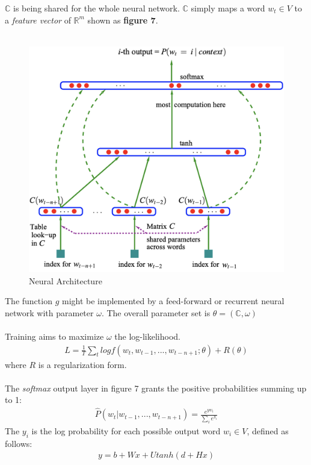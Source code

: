 \documentclass[paper=a4, fontsize=12pt]{scrartcl}
\begin{document}
 $\mathbb{C}$ is being shared for the whole neural network. $\mathbb{C}$ simply maps a word $w_t \in V$ to a \textit{feature vector} of $\mathbb{R}^m$ shown as \textbf{figure 7}.\\\\
 \begin{figure}
  \includegraphics[width=\linewidth]{neuralnet.png}
  \caption{Neural Architecture}
  \label{fig:nnlm}
\end{figure}
The function $g$ might be implemented by a feed-forward or recurrent neural network with parameter $\omega$. The overall parameter set is $\theta = (\mathbb{C}, \omega)$\\\\
Training aims to maximize $\omega$ the log-likelihood.
\begin{align*}
L = \frac{1}{T}\sum_{t}log f(w_t, w_{t-1}, ..., w_{t-n+1}; \theta) + R(\theta)
\end{align*}
where $R$ is a regularization form. \\\\
The \textit{softmax} output layer in figure 7 grants the positive probabilities summing up to 1:
\begin{align*}
\hat{P}(w_t | w_{t-1}, ..., w_{t-n+1}) = \frac{e^{yw_t}}{\sum_{i} e^{y_i}}
\end{align*}
The $y_i$ is the log probability for each possible output word $w_i \in V$, defined as follows:
\begin{align*}
y = b+Wx+U tanh(d +Hx)
\end{align*}
\end{document}
